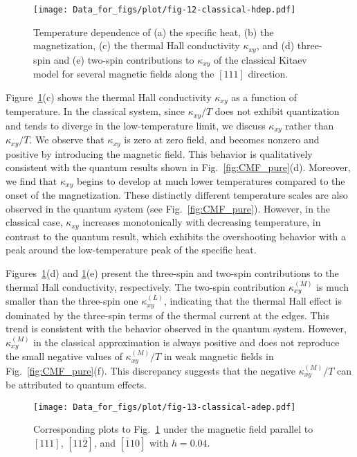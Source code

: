 \documentclass[twocolumn,superscriptaddress,showpacs, longbibliography, aps, prx]{revtex4-2}
\begin{document}
\begin{figure}[tbh] 
\begin{center} 
\texttt{[image: Data\_for\_figs/plot/fig-12-classical-hdep.pdf]}
\vspace{-0.5cm} 
\caption{Temperature dependence of (a) the specific heat, (b) the magnetization, (c) the thermal Hall conductivity $\kappa_{xy}$, and (d) three-spin and (e) two-spin contributions to $\kappa_{xy}$ of the classical Kitaev model for several magnetic fields along the $[111]$ direction.}
\label{fig_classical_hdep}
\end{center}
\end{figure}

Figure~\ref{fig_classical_hdep}(c) shows the thermal Hall conductivity $\kappa_{xy}$ as a function of temperature.
In the classical system, since $\kappa_{xy}/T$ does not exhibit quantization and tends to diverge in the low-temperature limit, we discuss $\kappa_{xy}$ rather than $\kappa_{xy}/T$.
We observe that $\kappa_{xy}$ is zero at zero field, and becomes nonzero and positive by introducing the magnetic field.  
This behavior is qualitatively consistent with the quantum results shown in Fig.~\ref{fig:CMF_pure}(d).
Moreover, we find that $\kappa_{xy}$ begins to develop at much lower temperatures compared to the onset of the magnetization.
These distinctly different temperature scales are also observed in the quantum system (see Fig.~\ref{fig:CMF_pure}). 
However, in the classical case, $\kappa_{xy}$ increases monotonically with decreasing temperature, in contrast to the quantum result, which exhibits the overshooting behavior with a peak around the low-temperature peak of the specific heat. 

Figures~\ref{fig_classical_hdep}(d) and \ref{fig_classical_hdep}(e) present the three-spin and two-spin contributions to the thermal Hall conductivity, respectively.
The two-spin contribution $\kappa_{xy}^{(M)}$ is much smaller than the three-spin 
one $\kappa_{xy}^{(L)}$, indicating that the thermal Hall effect is dominated by the three-spin terms of the thermal current at the edges.
This trend is consistent with the behavior observed in the quantum system. 
However, $\kappa_{xy}^{(M)}$ in the classical approximation is always positive and does not reproduce the small negative values of $\kappa_{xy}^{(M)}/T$ in weak magnetic fields in Fig.~\ref{fig:CMF_pure}(f). 
This discrepancy suggests that the negative $\kappa_{xy}^{(M)}/T$ can be attributed to quantum effects.

\begin{figure}[tbh] 
\begin{center} 
\texttt{[image: Data\_for\_figs/plot/fig-13-classical-adep.pdf]}
\vspace{-0.5cm} 
\caption{Corresponding plots to Fig.~\ref{fig_classical_hdep} under the magnetic field parallel to $[111]$, $[11\bar{2}]$, and $[\bar{1}10]$ with $h=0.04$.
}
\label{fig_classical_adep004}
\end{center}
\end{figure}
  
\end{document}
